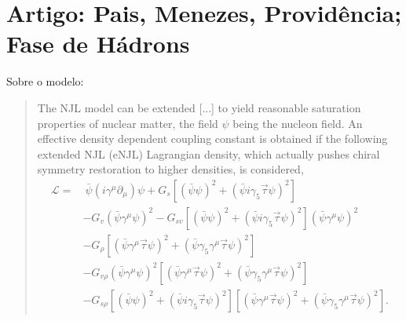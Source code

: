 \section{Artigo: Pais, Menezes, Providência; Fase de Hádrons}

Sobre o modelo\cite{Pais}:
\begin{quote}
The NJL model can be extended [...] to yield reasonable saturation properties of nuclear matter, the field $\psi$ being the nucleon field. An effective density dependent coupling constant is obtained if the following extended NJL (eNJL) Lagrangian density, which actually pushes chiral symmetry restoration to higher densities, is considered,
\begin{equation}\label{Eq:Lagrangiana_eNLJ_Pais}
\begin{split}
	\mathcal{L} =&~ \bar{\psi}(i\gamma^\mu\partial_\mu)\psi + G_s[(\bar{\psi}\psi)^2 + (\bar{\psi}i\gamma_5\vec{\tau}\psi)^2] \\
	& - G_v(\bar{\psi}\gamma^\mu\psi)^2 - G_{sv}[(\bar{\psi}\psi)^2 + (\bar{\psi}i\gamma_5\vec{\tau}\psi)^2](\bar{\psi}\gamma^\mu\psi)^2 \\
	& - G_\rho[(\bar{\psi}\gamma^\mu\vec{\tau}\psi)^2 + (\bar{\psi}\gamma_5\gamma^\mu\vec{\tau}\psi)^2] \\
	& - G_{v\rho}(\bar{\psi}\gamma^\mu\psi)^2[(\bar{\psi}\gamma^\mu\vec{\tau}\psi)^2 + (\bar{\psi}\gamma_5\gamma^\mu\vec{\tau}\psi)^2] \\
	& - G_{s\rho} [(\bar{\psi}\psi)^2 + (\bar{\psi}i\gamma_5\vec{\tau}\psi)^2][(\bar{\psi}\gamma^\mu\vec{\tau}\psi)^2 + (\bar{\psi}\gamma_5\gamma^\mu\vec{\tau}\psi)^2].
\end{split}
\end{equation}
\end{quote}

